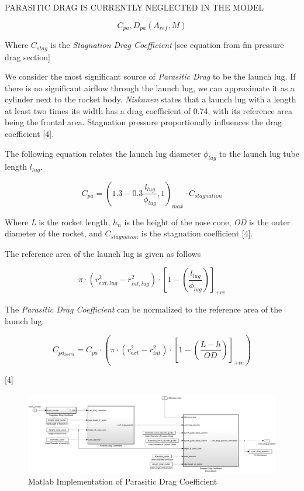 \documentclass[]{article}
\begin{document}
PARASITIC DRAG IS CURRENTLY NEGLECTED IN THE MODEL

\begin{equation}
C_{pa}, D_{pa} (A_{ref}, M) 
\end{equation}

Where \(C_{stag}\) is the \emph{Stagnation Drag Coefficient} {[}see
equation from fin pressure drag section{]}

We consider the most significant source of \emph{Parasitic Drag} to be
the launch lug. If there is no significant airflow through the launch
lug, we can approximate it as a cylinder next to the rocket body.
\emph{Niskanen} states that a launch lug with a length at least two
times its width has a drag coefficient of 0.74, with its reference area
being the frontal area. Stagnation pressure proportionally influences
the drag coefficient {[}4{]}.

The following equation relates the launch lug diameter \(\phi_{lug}\) to
the launch lug tube length \(l_{lug}\).

\begin{equation}
C_{pa} = \left( 1.3 - 0.3 \dfrac{l_{lug}}{\phi_{lug}} , 1 \right)_{max} \cdot C_{stagnation} 
\end{equation}

Where \emph{L} is the rocket length, \(h_n\) is the height of the nose
cone, \emph{OD} is the outer diameter of the rocket, and
\(C_{stagnation}\) is the stagnation coefficient {[}4{]}.

The reference area of the launch lug is given as follows

\begin{equation}
\label{eq_area_reference_launch_lug}
\pi \cdot (r_{ext,lug}^2 - r_{int,lug}^2) \cdot 
\left[ 1 - \left( \dfrac{l_{lug}}{\phi_{lug}} \right) \right]_{+ve} 
\end{equation}

The \emph{Parasitic Drag Coefficient} can be normalized to the reference
area of the launch lug.

\begin{equation}
\label{eq_coef_drag_parasitic_normalized}
C_{pa_{norm}} = 
C_{pa} \cdot 
\left( 
\pi \cdot (r_{ext}^2 - r_{int}^2) \cdot 
\left[ 1 - \left( \dfrac{L-h}{OD} \right)  \right]_{+ve} 
\right) 
\end{equation}

{[}4{]}

\begin{figure}[htbp]
\centering
\includegraphics{images/drag/coef_drag_parasitic.png}
\caption{Matlab Implementation of Parasitic Drag
Coefficient\label{img_coef_drag_parasitic_label}}
\end{figure}
\end{document}
